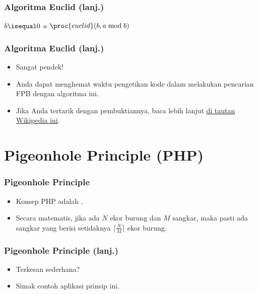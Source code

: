 \begin{frame}[fragile]
\frametitle{Algoritma Euclid (lanj.)}
\begin{codebox}
\li \If $b \isequal 0$
    \Then
\li   \Return $a$
\li \Else
\li   \Return $\proc{euclid}(b, a \bmod b)$ 
    \End
\end{codebox}
\end{frame}

\begin{frame}
\frametitle{Algoritma Euclid (lanj.)}
\begin{itemize}
  \item Sangat pendek!
  \item Anda dapat menghemat waktu pengetikan kode dalam melakukan pencarian FPB dengan algoritma ini.
  \item Jika Anda tertarik dengan pembuktiannya, baca lebih lanjut \textcolor{blue}{\href{https://en.wikipedia.org/wiki/Euclidean_algorithm}{di tautan Wikipedia ini}.}
\end{itemize}   
\end{frame}

\section{Pigeonhole Principle (PHP)}
\frame{\sectionpage}

\begin{frame}
\frametitle{Pigeonhole Principle}
\begin{itemize}
  \item Konsep PHP adalah .
  \item Secara matematis, jika ada $N$ ekor burung dan $M$ sangkar, maka pasti ada sangkar yang berisi setidaknya $\big\lceil \frac{N}{M} \big\rceil$ ekor burung.
\end{itemize}
\end{frame}

\begin{frame}
\frametitle{Pigeonhole Principle (lanj.)}
\begin{itemize}
  \item Terkesan sederhana?
  \item Simak contoh aplikasi prinsip ini.
\end{itemize}
\end{frame}

